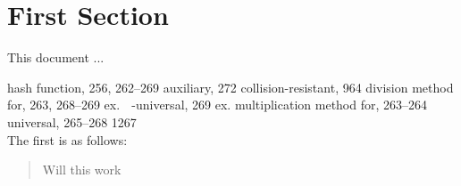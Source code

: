\documentclass[a4paper,10pt]{article}
\begin{document}
 
\tableofcontents
 
\section{First Section}
This document ...

hash function, 256, 262–269
	auxiliary, 272
	collision-resistant, 964
	division method for, 263, 268–269 ex.
	\epsilon -universal, 269 ex.
	multiplication method for, 263–264
	universal, 265–268
1267 \\


The first is as follows:
\begin{quote}
\cite{Scrum} Will this work
\end{quote}

\nocite{*} 
% 


 
\end{document}
